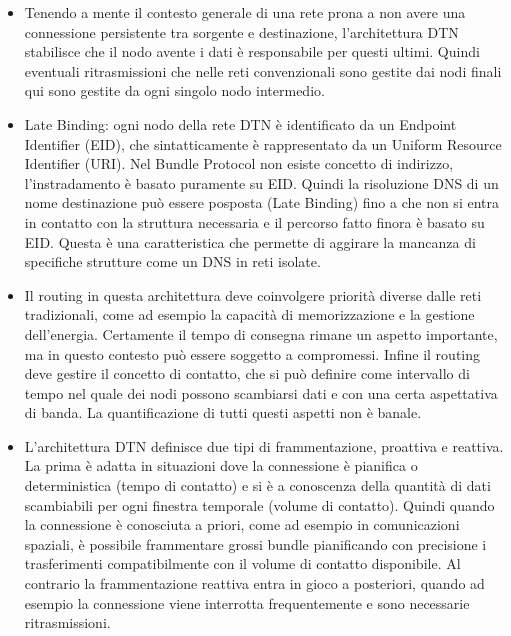 \documentclass[a4paper]{article}
\begin{document}
\begin{itemize}
			\item Tenendo a mente il contesto generale di una rete prona a non avere una connessione persistente tra sorgente e destinazione, l'architettura DTN stabilisce che il nodo avente i dati è responsabile per questi ultimi. Quindi eventuali ritrasmissioni che nelle reti convenzionali sono gestite dai nodi finali qui sono gestite da ogni singolo nodo intermedio.
			
			\item Late Binding: ogni nodo della rete DTN è identificato da un Endpoint Identifier (EID), che sintatticamente è rappresentato da un Uniform Resource Identifier (URI). Nel Bundle Protocol non esiste concetto di indirizzo, l'instradamento è basato puramente su EID. Quindi la risoluzione DNS di un nome destinazione può essere posposta (Late Binding) fino a che non si entra in contatto con la struttura necessaria e il percorso fatto finora è basato su EID. Questa è una caratteristica che permette di aggirare la mancanza di specifiche strutture come un DNS in reti isolate.
			
			\item Il routing in questa architettura deve coinvolgere priorità diverse dalle reti tradizionali, come ad esempio la capacità di memorizzazione e la gestione dell'energia. Certamente il tempo di consegna rimane un aspetto importante, ma in questo contesto può essere soggetto a compromessi. Infine il routing deve gestire il concetto di contatto, che si può definire come intervallo di tempo nel quale dei nodi possono scambiarsi dati e con una certa aspettativa di banda. La  quantificazione di tutti questi aspetti non è banale.
			
			\item L'architettura DTN definisce due tipi di frammentazione, proattiva e reattiva. La prima è adatta in situazioni dove la connessione è pianifica o deterministica (tempo di contatto) e si è a conoscenza della quantità di dati scambiabili per ogni finestra temporale (volume di contatto). Quindi quando la connessione è conosciuta a priori, come ad esempio in comunicazioni spaziali, è possibile frammentare grossi bundle pianificando con precisione i trasferimenti compatibilmente con il volume di contatto disponibile.
			Al contrario la frammentazione reattiva entra in gioco a posteriori, quando ad esempio la connessione viene interrotta frequentemente e sono necessarie ritrasmissioni.
			
			
		\end{itemize}
		
\end{document}
